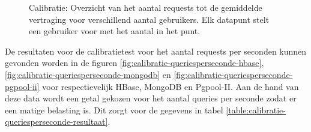 \begin{figure}[h!] 
\centering
	\caption{Calibratie: Overzicht van het aantal requests tot de gemiddelde vertraging voor verschillend aantal gebruikers. Elk datapunt stelt een gebruiker voor met het aantal in het punt. }
	\label{fig:calibratie-gebruikers-resultaat}
\end{figure}

De resultaten voor de calibratietest voor het aantal requests per seconden kunnen gevonden worden in de figuren \ref{fig:calibratie-queriesperseconde-hbase}, \ref{fig:calibratie-queriesperseconde-mongodb} en \ref{fig:calibratie-queriesperseconde-pgpool-ii} voor respectievelijk HBase, MongoDB en Pgpool-II. Aan de hand van deze data wordt een getal gekozen voor het aantal queries per seconde zodat er een matige belasting is. Dit zorgt voor de gegevens in tabel \ref{table:calibratie-queriesperseconde-resultaat}.  

